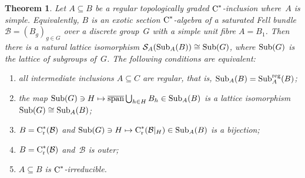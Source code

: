 \documentclass[a4paper]{amsart}
\theoremstyle{plain}
\newtheorem{theorem}{Theorem}
\theoremstyle{definition}
\theoremstyle{remark}
\numberwithin{theorem}{section}
\numberwithin{equation}{section}
\DeclareMathOperator*{\clsp}{\overline{span}} %
\newcommand*{\nb}{\nobreakdash}
\newcommand*{\red}{\mathrm{r}}%
\newcommand*{\Cst}{\textup C^*}%
\newcommand*{\Slice}{\mathcal S}%
\newcommand*{\Sub}{\textup{Sub}}%
\newcommand*{\B}{\mathcal B}%
\begin{document}
\begin{theorem}
  \label{thm:Galois_correspondence_explained}
  Let \(A\subseteq B\) be a regular topologically graded
  \(\Cst\)\nb-inclusion where~\(A\) is simple.
  Equivalently, \(B\) is an exotic section \(\Cst\)\nb-algebra of a
  saturated Fell bundle \(\B=(B_g)_{g\in G}\) over a discrete
  group~\(G\) with a simple unit fibre \(A=B_1\).
  Then there is a natural lattice isomorphism
  \(\Slice_A(\Sub_A(B))\cong \Sub(G)\), where \(\Sub(G)\) is the
  lattice of subgroups of~\(G\).
  The following conditions are equivalent:
  \begin{enumerate}
  \item \label{enu:Galois_correspondence_explained1}%
    all intermediate inclusions \(A\subseteq C\) are regular, that is,
    \(\Sub_A(B)=\Sub_A^{\textup{reg}}(B)\);
  \item \label{enu:Galois_correspondence_explained1.25}%
    the map \(\Sub(G)\ni H\mapsto \clsp\bigcup_{h\in H} B_h\in
    \Sub_A(B)\)  is a lattice isomorphism \(\Sub(G)\cong \Sub_A(B)\);
  \item \label{enu:Galois_correspondence_explained1.5}%
    \(B=\Cst_\red(\B)\)  and \(\Sub(G)\ni H \mapsto
    \Cst_\red(\B|_{H})\in \Sub_A(B)\) is a bijection;
  \item \label{enu:Galois_correspondence_explained3}%
    \(B=\Cst_\red(\B)\)  and~\(\B\) is outer;
  \item \label{enu:Galois_correspondence_explained2}%
    \(A\subseteq B\) is \(\Cst\)\nb-irreducible.
  \end{enumerate}
\end{theorem}
\end{document}
